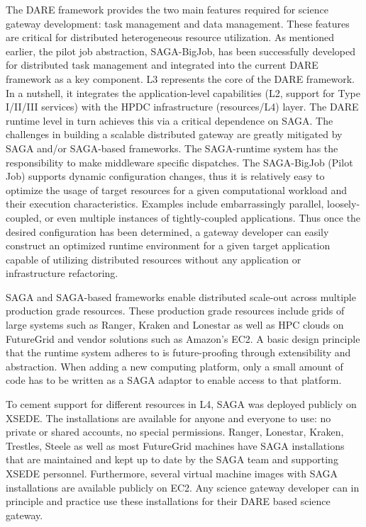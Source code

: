 \documentclass[]{svjour3}
\begin{document}
The DARE framework provides the two main features required for science
gateway development: task management and data management.  These
features are critical for distributed heterogeneous resource
utilization. As mentioned earlier, the pilot job abstraction,
SAGA-BigJob, has been successfully developed for distributed task
management and integrated into the current DARE framework as a key
component.  L3 represents the core of the DARE framework. In a
nutshell, it integrates the application-level capabilities (L2,
support for Type I/II/III services) with the HPDC infrastructure
(resources/L4) layer. The DARE runtime level in turn achieves this via
a critical dependence on SAGA. The challenges in building a scalable
distributed gateway are greatly mitigated by SAGA and/or SAGA-based
frameworks. The SAGA-runtime system has the responsibility to make
middleware specific dispatches.  The SAGA-BigJob (Pilot Job) supports
dynamic configuration changes, thus it is relatively easy to optimize
the usage of target resources for a given computational workload and
their execution characteristics. Examples include embarrassingly
parallel, loosely-coupled, or even multiple instances of
tightly-coupled applications. Thus once the desired configuration has
been determined, a gateway developer can easily construct an optimized
runtime environment for a given target application capable of
utilizing distributed resources without any application or
infrastructure refactoring.

SAGA and SAGA-based frameworks enable distributed scale-out across
multiple production grade resources. These production grade resources
include grids of large systems such as Ranger, Kraken and Lonestar as
well as HPC clouds on FutureGrid and vendor solutions such as Amazon's
EC2. A basic design principle that the runtime system adheres to is
future-proofing through extensibility and abstraction. When adding a
new computing platform, only a small amount of code has to be written
as a SAGA adaptor to enable access to that platform.

To cement support for different resources in L4, SAGA was deployed
publicly on XSEDE. The installations are available for anyone and
everyone to use: no private or shared accounts, no special
permissions. Ranger, Lonestar, Kraken, Trestles, Steele as well as
most FutureGrid machines have SAGA installations that are maintained
and kept up to date by the SAGA team and supporting XSEDE
personnel. Furthermore, several virtual machine images with SAGA
installations are available publicly on EC2. Any science gateway
developer can in principle and practice use these installations for
their DARE based science gateway.
\end{document}
